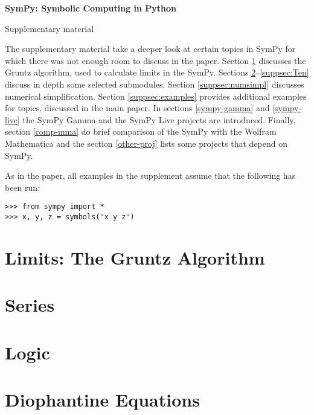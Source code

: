 \documentclass[fleqn,10pt,lineno,numbers]{wlpeerj} %
\begin{document}
\flushbottom
\thispagestyle{empty}%
\vskip-36pt%
{\raggedright\sffamily\bfseries\fontsize{20}{25}\selectfont SymPy: Symbolic Computing in Python\par}%
\vskip10pt
{\raggedright\sffamily\fontsize{12}{16}\selectfont  Supplementary material\par}
\vskip25pt%

The supplementary material take a deeper look at certain topics in SymPy for
which there was not enough room to discuss in the paper.
Section \ref{suppsec:Gruntz} discusses the Gruntz algorithm, used to
calculate limits in the SymPy.  Sections \ref{suppsec:Series}--\ref{suppsec:Ten}
discuss in depth some selected submodules.  Section \ref{suppsec:numsimpl}
discusses numerical simplification.  Section \ref{suppsec:examples} provides
additional examples for topics, discussed in the main paper.  In sections
\ref{sympy-gamma} and \ref{sympy-live} the SymPy Gamma
and the SymPy Live projects are introduced.  Finally, section \ref{comp-mma} do
brief comparison of the SymPy with the Wolfram Mathematica and the
section \ref{other-proj} lists some projects that depend on SymPy.

As in the paper, all examples in the supplement assume that the following
has been run:
\begin{verbatim}
>>> from sympy import *
>>> x, y, z = symbols('x y z')
\end{verbatim}


\section{Limits: The Gruntz Algorithm}
\label{suppsec:Gruntz}


\section{Series}
\label{suppsec:Series}


\section{Logic}
\label{suppsec:Logic}


\section{Diophantine Equations}
\label{suppsec:Dioph}

\end{document}
